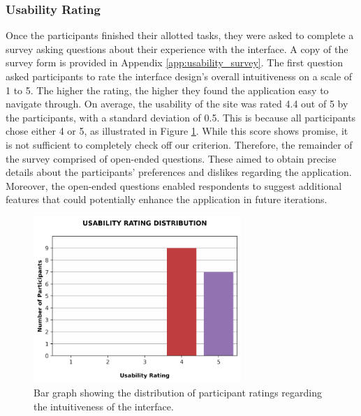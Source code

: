 \documentclass{l4proj}
\begin{document}
\subsubsection{Usability Rating}
Once the participants finished their allotted tasks, they were asked to complete a survey asking questions about their experience with the interface. A copy of the survey form is provided in Appendix \ref{app:usability_survey}. The first question asked participants to rate the interface design's overall intuitiveness on a scale of 1 to 5. The higher the rating, the higher they found the application easy to navigate through. On average, the usability of the site was rated 4.4 out of 5 by the participants, with a standard deviation of 0.5. This is because all participants chose either 4 or 5, as illustrated in Figure \ref{fig:rating_distribution}. While this score shows promise, it is not sufficient to completely check off our criterion. Therefore, the remainder of the survey comprised of open-ended questions. These aimed to obtain precise details about the participants' preferences and dislikes regarding the application. Moreover, the open-ended questions enabled respondents to suggest additional features that could potentially enhance the application in future iterations.

\begin{figure}
    \centering
    \includegraphics[width=0.7\textwidth]{figures/rating_distribution.pdf}
    \caption{Bar graph showing the distribution of participant ratings regarding the intuitiveness of the interface.}
    \label{fig:rating_distribution}
\end{figure}
\end{document}
